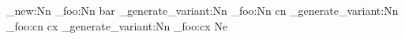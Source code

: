 \cs_new:Nn
  \module_foo:Nn
  { bar }
\cs_generate_variant:Nn
  \module_foo:Nn
  { cn }
\cs_generate_variant:Nn
  \module_foo:cn
  { cx }
\cs_generate_variant:Nn
  \module_foo:cx
  { Ne }  %
